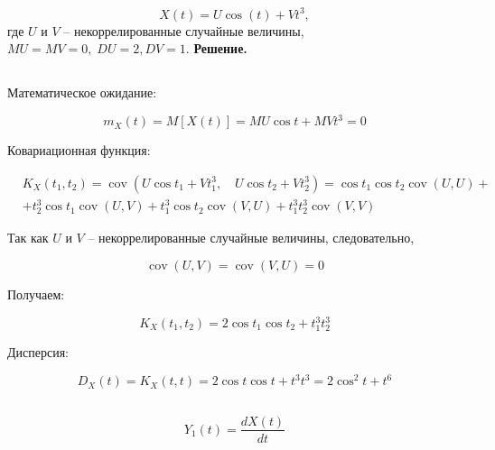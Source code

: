 \documentclass[12 pt]{article}
\begin{document}
\begin{equation}
	X(t) = U\cos(t) + Vt^3,
\end{equation}
	где $U$ и $V$ -- некоррелированные случайные величины, $MU = MV = 0, \; {DU = 2, DV = 1}$.
\newpage
\textbf{Решение.}

\subsection{}

Математическое ожидание:

\begin{equation}
	m_{X}(t)=M[X(t)]=M U \cos t+M V t^{3}=0
\end{equation}

Ковариационная функция:

\begin{equation}
	\begin{aligned}
	&K_{X}\left(t_{1}, t_{2}\right)=\operatorname{cov}\left(U \cos t_{1}+V t_{1}^{3}, \quad U \cos t_{2}+V t_{2}^{3}\right)=\cos t_{1} \cos t_{2} \operatorname{cov}(U, U)+\\
	&+t_{2}^{3} \cos t_{1} \operatorname{cov}(U, V)+t_{1}^{3} \cos t_{2} \operatorname{cov}(V, U)+t_{1}^{3} t_{2}^{3} \operatorname{cov}(V, V)
	\end{aligned}
\end{equation}


Так как $U$ и $V$ -- некоррелированные случайные величины, следовательно, 

\begin{equation}
	\operatorname{cov}(U, V) = \operatorname{cov}(V, U) = 0
\end{equation}


Получаем:

\begin{equation}
	K_{X}\left(t_{1}, t_{2}\right)=2 \cos t_{1} \cos t_{2}+t_{1}^{3} t_{2}^{3}
\end{equation}

Дисперсия:

\begin{equation}
	D_{X}(t)=K_{X}(t, t)=2 \operatorname{cos}t \cos t+t^{3} t^{3}=2 \cos ^{2} t+t^{6}
\end{equation}

\newpage
\subsection{}

\begin{equation}
	Y_1(t) = \frac{dX(t)}{dt}
\end{equation}
\end{document}
